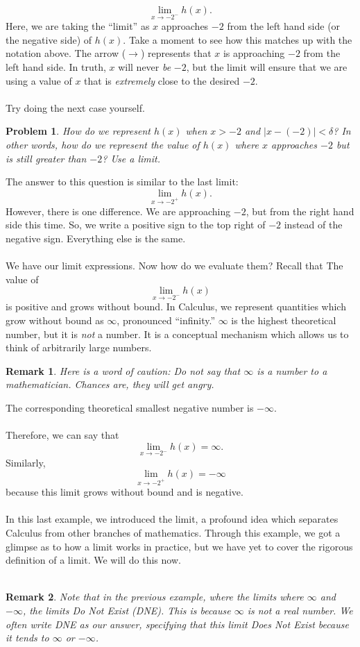 \documentclass{article}
\newtheorem*{remark}{Remark}
\newtheorem*{problem}{Problem}
\begin{document}
\[\lim_{x\to -2^-} h(x).\]
Here, we are taking the ``limit'' as $x$ approaches $-2$ from the left  hand side (or the negative side) of $h(x)$. Take a moment to see how this matches up with the notation above. The arrow ($\to$) represents that $x$ is approaching $-2$ from the left hand side. In truth, $x$ will never \textit{be} $-2$, but the limit will ensure that we are using a value of $x$ that is \textit{extremely} close to the desired $-2$. 
\\
\\
Try doing the next case yourself.
\begin{problem}
How do we represent $h(x)$ when $x>-2$ and $\left|x-(-2)\right|<\delta$? In other words, how do we represent the value of $h(x)$ where $x$ \textit{approaches} $-2$ but is still greater than $-2$? Use a limit.
\end{problem}

The answer to this question is similar to the last limit:
\[\lim_{x\to -2^+} h(x).\]
However, there is one difference. We are approaching $-2$, but from the right hand side this time. So, we write a positive sign to the top right of $-2$ instead of the negative sign. Everything else is the same. 
\\
\\
We have our limit expressions. Now how do we evaluate them? Recall that The value of 
\[\lim_{x\to -2^-} h(x)\]
is positive and grows without bound. In Calculus, we represent quantities which grow without bound as $\infty$, pronounced ``infinity.'' $\infty$ is the highest theoretical number, but it is \textit{not} a number. It is a conceptual mechanism which allows us to think of arbitrarily large numbers.
\begin{remark}
Here is a word of caution: Do not say that $\infty$ is a number to a mathematician. Chances are, they will get angry. \Smiley
\end{remark}
The corresponding theoretical smallest negative number is $-\infty$. 
\\
\\
Therefore, we can say that 
\[\lim_{x\to -2^-} h(x)=\infty.\]
Similarly,
\[\lim_{x\to -2^+} h(x)=-\infty\]
because this limit grows without bound and is negative.
\\
\\
In this last example, we introduced the limit, a profound idea which separates Calculus from other branches of mathematics. Through this example, we got a glimpse as to how a limit works in practice, but we have yet to cover the rigorous definition of a limit. We will do this now.
\\
\\
\begin{remark}
Note that in the previous example, where the limits where $\infty$ and $-\infty$, the limits Do Not Exist (DNE). This is because $\infty$ is not a real number. We often write DNE as our answer, specifying that this limit Does Not Exist because it tends to $\infty$ or $-\infty$. 
\end{remark}
\end{document}
